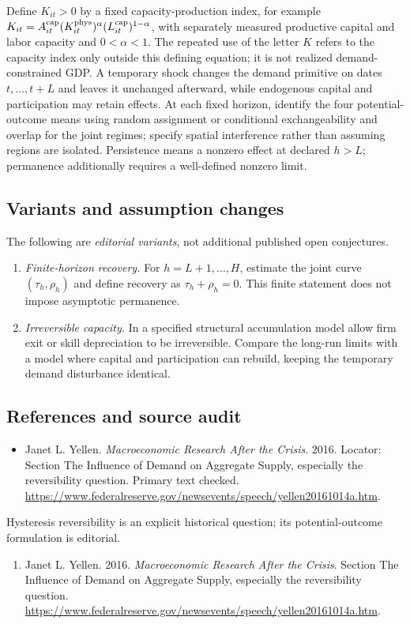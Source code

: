 \documentclass[11pt,a4paper]{article}
\begin{document}
Define \(K_{it}>0\) by a fixed capacity-production index, for example \(K_{it}=A_{it}^{\rm cap}(K_{it}^{\rm phys})^\alpha(L_{it}^{\rm cap})^{1-\alpha}\), with separately measured productive capital and labor capacity and \(0<\alpha<1\). The repeated use of the letter \(K\) refers to the capacity index only outside this defining equation; it is not realized demand-constrained GDP. A temporary shock changes the demand primitive on dates \(t,\ldots,t+L\) and leaves it unchanged afterward, while endogenous capital and participation may retain effects. At each fixed horizon, identify the four potential-outcome means using random assignment or conditional exchangeability and overlap for the joint regimes; specify spatial interference rather than assuming regions are isolated. Persistence means a nonzero effect at declared \(h>L\); permanence additionally requires a well-defined nonzero limit.
\subsection*{Variants and assumption changes}
The following are \emph{editorial variants}, not additional published open conjectures.
\begin{enumerate}
\item \emph{Finite-horizon recovery.} For \(h=L+1,\ldots,H\), estimate the joint curve \((\tau_h,\rho_h)\) and define recovery as \(\tau_h+\rho_h=0\). This finite statement does not impose asymptotic permanence.
\item \emph{Irreversible capacity.} In a specified structural accumulation model allow firm exit or skill depreciation to be irreversible. Compare the long-run limits with a model where capital and participation can rebuild, keeping the temporary demand disturbance identical.
\end{enumerate}
\subsection*{References and source audit}
\begin{itemize}
\item Janet L. Yellen. \emph{Macroeconomic Research After the Crisis}. 2016. Locator: Section The Influence of Demand on Aggregate Supply, especially the reversibility question. Primary text checked. \url{https://www.federalreserve.gov/newsevents/speech/yellen20161014a.htm}.
\end{itemize}
Hysteresis reversibility is an explicit historical question; its potential-outcome formulation is editorial.
\begin{enumerate}\raggedright
\item\hypertarget{definitions:source:30007517:1}{} Janet L. Yellen. 2016. \emph{Macroeconomic Research After the Crisis}. Section The Influence of Demand on Aggregate Supply, especially the reversibility question.
\url{https://www.federalreserve.gov/newsevents/speech/yellen20161014a.htm}.
\end{enumerate}
\end{document}
